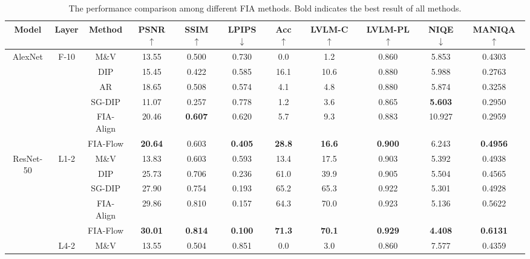 \begin{table}[t]
\setlength{\tabcolsep}{1.4mm}
\caption{The performance comparison among different FIA methods. Bold indicates the best result of all methods.}
\label{table-compare}
\renewcommand\arraystretch{0.7}
\centering
\begin{tabular}{ccccccccccc}
\toprule
Model & Layer & Method & PSNR $\uparrow$& SSIM $\uparrow$& LPIPS $\downarrow$ & Acc $\uparrow$& LVLM-C $\uparrow$& LVLM-PL $\uparrow$& NIQE $\downarrow$ & MANIQA $\uparrow$\\
  \midrule
 \multirow{6}{*}{AlexNet} & \multirow{6}{*}{F-10} & M\&V & 13.55 & 0.500 & 0.730 & 0.0 & 1.2&0.860 & 5.853 & 0.4303 \\
 & & DIP &15.45 &0.422 &0.585  &16.1 &10.6&0.880 & 5.988 &0.2763 \\
 & & AR & 18.65 & 0.508 & 0.574 & 4.1 & 4.8 & 0.880 & 5.874 &0.3258 \\
  & & SG-DIP & 11.07&0.257 &0.778  & 1.2&3.6 & 0.865 &\textbf{5.603} &0.2950 \\
  & & FIA-Align &20.46 & \textbf{0.607}  &0.620 & 5.7&9.3& 0.883&10.927 &0.2959  \\
 & & \cellcolor{myhighlight}FIA-Flow & \cellcolor{myhighlight}\textbf{20.64}& \cellcolor{myhighlight}0.603&\cellcolor{myhighlight}\textbf{0.405}  &\cellcolor{myhighlight}\textbf{28.8}& \cellcolor{myhighlight}\textbf{16.6}& \cellcolor{myhighlight}\textbf{0.900}& \cellcolor{myhighlight}6.243&\cellcolor{myhighlight}\textbf{0.4956}  \\
 \midrule
\multirow{10}{*}{ResNet-50} & \multirow{5}{*}{L1-2} & M\&V & 13.83 & 0.603 & 0.593 & 13.4 &17.5  &0.903  & 5.392 & 0.4938\\
 & & DIP & 25.73 & 0.706 & 0.236 & 61.0 &  39.9&0.905 & 5.504 & 0.4565 \\
  & & SG-DIP & 27.90&0.754 &0.193  & 65.2& 65.3 &0.922 &5.301 &0.4928 \\
  & & FIA-Align & 29.86 & 0.810&0.157  & 64.3& 70.0&0.923 & 5.136 & 0.5622 \\
 & & \cellcolor{myhighlight}FIA-Flow &\cellcolor{myhighlight}\textbf{30.01} &\cellcolor{myhighlight}\textbf{0.814} &\cellcolor{myhighlight}\textbf{0.100}  &\cellcolor{myhighlight}\textbf{71.3}&\cellcolor{myhighlight}\textbf{70.1} & \cellcolor{myhighlight}\textbf{0.929}& \cellcolor{myhighlight}\textbf{4.408}&\cellcolor{myhighlight}\textbf{0.6131}  \\
\cmidrule{2-11}
 & \multirow{5}{*}{L4-2} & M\&V & 13.55 & 0.504 & 0.851 & 0.0&3.0 &  0.860 & 7.577 & 0.4359\\

\end{tabular}
\end{table}
